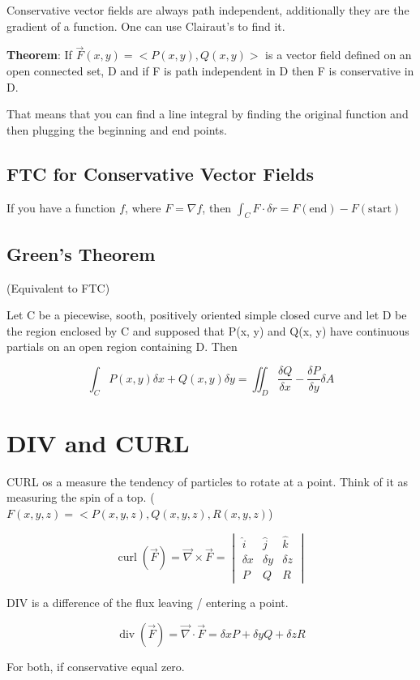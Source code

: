\documentclass{article}
\newcommand{\CURL}{\operatorname{curl}}
\newcommand{\DIV}{\operatorname{div}}
\begin{document}
Conservative vector fields are always path independent, additionally they are the gradient of a function. One can use Clairaut's to find it. 

\textbf{Theorem}: If $\vec{F}(x, y) = <P(x, y), Q(x, y)>$ is a vector field defined on an open connected set, D and if F is path independent in D then F is conservative in D.

That means that you can find a line integral by finding the original function and then plugging the beginning and end points. 

\subsection{FTC for Conservative Vector Fields}

If you have a function $f$, where $F = \nabla f$, then $\int_C F \cdot \delta r = F(\text{end}) - F(\text{start})$

\subsection{Green's Theorem}

(Equivalent to FTC)

Let C be a piecewise, sooth, positively oriented simple closed curve and let D be the region enclosed by C and supposed that P(x, y) and Q(x, y) have continuous partials on an open region containing D. Then 

$$\int_C P(x, y) \delta x + Q(x, y) \delta y = \iint_D \frac{\delta Q}{\delta x} - \frac{\delta P}{\delta y} \delta A$$



\section{DIV and CURL}

CURL os a measure the tendency of particles to rotate at a point. Think of it as measuring the spin of a top. ($F(x, y, z) = <P(x, y, z), Q(x,y,z), R(x,y,z)$)

\[
\CURL(\vec{F}) = \vec{\nabla} \times \vec{F} = \begin{vmatrix}
    \hat{i} & \hat{j} & \hat{k} \\
    \delta x & \delta y & \delta z \\
    P & Q & R
\end{vmatrix}
\]

DIV is a difference of the flux leaving / entering a point. 

\[
\DIV(\vec{F}) =  \vec{\nabla} \cdot \vec{F} = \delta x P + \delta y Q + \delta z R
\]



For both, if conservative equal zero.
\end{document}
